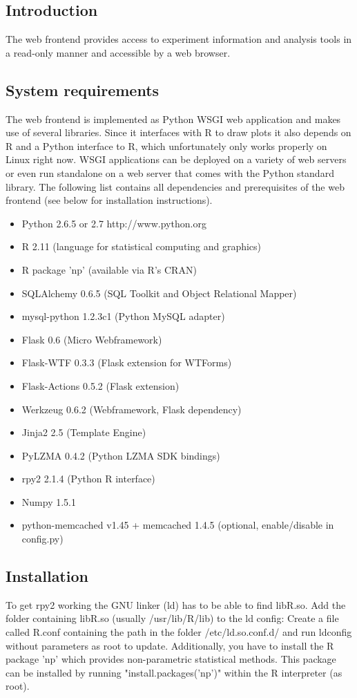 \upshape
\subsection{Introduction}
The web frontend provides access to experiment information and analysis tools in a read-only manner
and accessible by a web browser.

\subsection{System requirements}
The web frontend is implemented as Python WSGI web application and makes use of several libraries.
Since it interfaces with R to draw plots it also depends on R and a Python interface to R, which unfortunately
only works properly on Linux right now.
WSGI applications can be deployed on a variety of web servers or even run standalone on a web server that comes with the
Python standard library.
The following list contains all dependencies and prerequisites of the web frontend (see below for installation instructions).
\begin{itemize}
\item Python 2.6.5 or 2.7 http://www.python.org
\item R 2.11 (language for statistical computing and graphics)
\item R package 'np' (available via R's CRAN)
\item SQLAlchemy 0.6.5 (SQL Toolkit and Object Relational Mapper)
\item mysql-python 1.2.3c1 (Python MySQL adapter)
\item Flask 0.6 (Micro Webframework)
\item Flask-WTF 0.3.3 (Flask extension for WTForms)
\item Flask-Actions 0.5.2 (Flask extension)
\item Werkzeug 0.6.2 (Webframework, Flask dependency)
\item Jinja2 2.5 (Template Engine)
\item PyLZMA 0.4.2 (Python LZMA SDK bindings)
\item rpy2 2.1.4 (Python R interface)
\item Numpy 1.5.1
\item python-memcached v1.45 + memcached 1.4.5 (optional, enable/disable in config.py)
\end{itemize}

\subsection{Installation}
To get rpy2 working the GNU linker (ld) has to be able to find libR.so. Add the folder containing
libR.so (usually /usr/lib/R/lib) to the ld config: Create a file called R.conf containing the
path in the folder /etc/ld.so.conf.d/ and run ldconfig without parameters as root to update.
Additionally, you have to install the R package 'np' which provides non-parametric statistical
methods. This package can be installed by running "install.packages('np')" within the R interpreter (as root).

